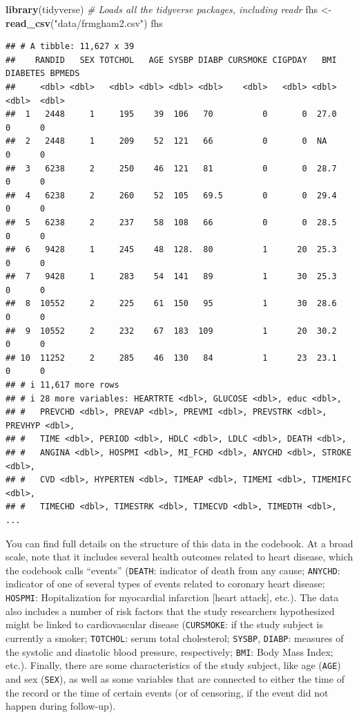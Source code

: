 \documentclass[
]{book}
\newenvironment{Shaded}{\begin{snugshade}}{\end{snugshade}}
\newcommand{\CommentTok}[1]{\textcolor[rgb]{0.56,0.35,0.01}{\textit{#1}}}
\newcommand{\FunctionTok}[1]{\textcolor[rgb]{0.13,0.29,0.53}{\textbf{#1}}}
\newcommand{\NormalTok}[1]{#1}
\newcommand{\OtherTok}[1]{\textcolor[rgb]{0.56,0.35,0.01}{#1}}
\newcommand{\StringTok}[1]{\textcolor[rgb]{0.31,0.60,0.02}{#1}}
\begin{document}
\begin{Shaded}
\begin{Highlighting}[]
\FunctionTok{library}\NormalTok{(tidyverse) }\CommentTok{\# Loads all the tidyverse packages, including readr}
\NormalTok{fhs }\OtherTok{\textless{}{-}} \FunctionTok{read\_csv}\NormalTok{(}\StringTok{"data/frmgham2.csv"}\NormalTok{)}
\NormalTok{fhs}
\end{Highlighting}
\end{Shaded}

\begin{verbatim}
## # A tibble: 11,627 x 39
##    RANDID   SEX TOTCHOL   AGE SYSBP DIABP CURSMOKE CIGPDAY   BMI DIABETES BPMEDS
##     <dbl> <dbl>   <dbl> <dbl> <dbl> <dbl>    <dbl>   <dbl> <dbl>    <dbl>  <dbl>
##  1   2448     1     195    39  106   70          0       0  27.0        0      0
##  2   2448     1     209    52  121   66          0       0  NA          0      0
##  3   6238     2     250    46  121   81          0       0  28.7        0      0
##  4   6238     2     260    52  105   69.5        0       0  29.4        0      0
##  5   6238     2     237    58  108   66          0       0  28.5        0      0
##  6   9428     1     245    48  128.  80          1      20  25.3        0      0
##  7   9428     1     283    54  141   89          1      30  25.3        0      0
##  8  10552     2     225    61  150   95          1      30  28.6        0      0
##  9  10552     2     232    67  183  109          1      20  30.2        0      0
## 10  11252     2     285    46  130   84          1      23  23.1        0      0
## # i 11,617 more rows
## # i 28 more variables: HEARTRTE <dbl>, GLUCOSE <dbl>, educ <dbl>,
## #   PREVCHD <dbl>, PREVAP <dbl>, PREVMI <dbl>, PREVSTRK <dbl>, PREVHYP <dbl>,
## #   TIME <dbl>, PERIOD <dbl>, HDLC <dbl>, LDLC <dbl>, DEATH <dbl>,
## #   ANGINA <dbl>, HOSPMI <dbl>, MI_FCHD <dbl>, ANYCHD <dbl>, STROKE <dbl>,
## #   CVD <dbl>, HYPERTEN <dbl>, TIMEAP <dbl>, TIMEMI <dbl>, TIMEMIFC <dbl>,
## #   TIMECHD <dbl>, TIMESTRK <dbl>, TIMECVD <dbl>, TIMEDTH <dbl>, ...
\end{verbatim}

You can find full details on the structure of this data in the codebook. At a broad scale, note that it includes several health outcomes related to heart disease, which the codebook calls ``events'' (\texttt{DEATH}: indicator of death from any cause; \texttt{ANYCHD}: indicator of one of several types of events related to coronary heart disease; \texttt{HOSPMI}: Hopitalization for myocardial infarction {[}heart attack{]}, etc.). The data also includes a number of risk factors that the study researchers hypothesized might be linked to cardiovascular disease (\texttt{CURSMOKE}: if the study subject is currently a smoker; \texttt{TOTCHOL}: serum total cholesterol; \texttt{SYSBP}, \texttt{DIABP}: measures of the systolic and diastolic blood pressure, respectively; \texttt{BMI}: Body Mass Index; etc.). Finally, there are some characteristics of the study subject, like age (\texttt{AGE}) and sex (\texttt{SEX}), as well as some variables that are connected to either the time of the record or the time of certain events (or of censoring, if the event did not happen during follow-up).
\end{document}
